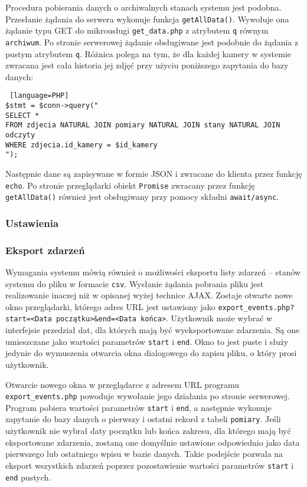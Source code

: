 \documentclass[a4paper,12pt,twoside]{article}
\begin{document}
Procedura pobierania danych o archiwalnych stanach systemu jest podobna. Przesłanie żądania do serwera wykonuje funkcja \texttt{getAllData()}. Wywołuje ona żądanie typu GET do mikrousługi \texttt{get{\_}data.php} z atrybutem \texttt{q} równym \texttt{archiwum}. Po stronie serwerowej żądanie obsługiwane jest podobnie do żądania z pustym atrybutem \texttt{q}. Różnica polega na tym, że dla każdej kamery w systemie zwracana jest cała historia jej zdjęć przy użyciu poniższego zapytania do bazy danych:
\begin{lstlisting} [language=PHP]
$stmt = $conn->query("
SELECT *
FROM zdjecia NATURAL JOIN pomiary NATURAL JOIN stany NATURAL JOIN odczyty
WHERE zdjecia.id_kamery = $id_kamery
");
\end{lstlisting}
Następnie dane są zapisywane w formie JSON i zwracane do klienta przez funkcję \texttt{echo}. Po stronie przeglądarki obiekt \texttt{Promise} zwracany przez funkcję \texttt{getAllData()} również jest obsługiwany przy pomocy składni \texttt{await/async}. 

\subsubsection{Ustawienia}

\subsubsection{Eksport zdarzeń}
Wymagania systemu mówią również o możliwości eksportu listy zdarzeń -- stanów systemu do pliku w formacie \texttt{csv}. Wysłanie żądania pobrania pliku jest realizowanie inaczej niż w opisanej wyżej technice AJAX. Zostaje otwarte nowe okno przeglądarki, którego adres URL jest ustawiony jako \texttt{export{\_}events.php?start=<Data początku>{\&}end=<Data końca>}. Użytkownik może wybrać w interfejsie przedział dat, dla których mają być wyeksportowane zdarzenia. Są one umieszczane jako wartości parametrów \texttt{start} i \texttt{end}. Okno to jest puste i służy jedynie do wymuszenia otwarcia okna dialogowego do zapisu pliku, o który prosi użytkownik.

Otwarcie nowego okna w przeglądarce z adresem URL programu \texttt{export{\_}events.php} powoduje wywołanie jego działania po stronie serwerowej. Program pobiera wartości parametrów \texttt{start} i \texttt{end}, a następnie wykonuje zapytanie do bazy danych o pierwszy i ostatni rekord z tabeli \texttt{pomiary}. Jeśli użytkownik nie wybrał daty początku lub końca zakresu, dla którego mają być eksportowane zdarzenia, zostaną one domyślnie ustawione odpowiednio jako data pierwszego lub ostatniego wpisu w bazie danych. Takie podejście pozwala na eksport wszystkich zdarzeń poprzez pozostawienie wartości parametrów \texttt{start} i \texttt{end} pustych.
\end{document}
